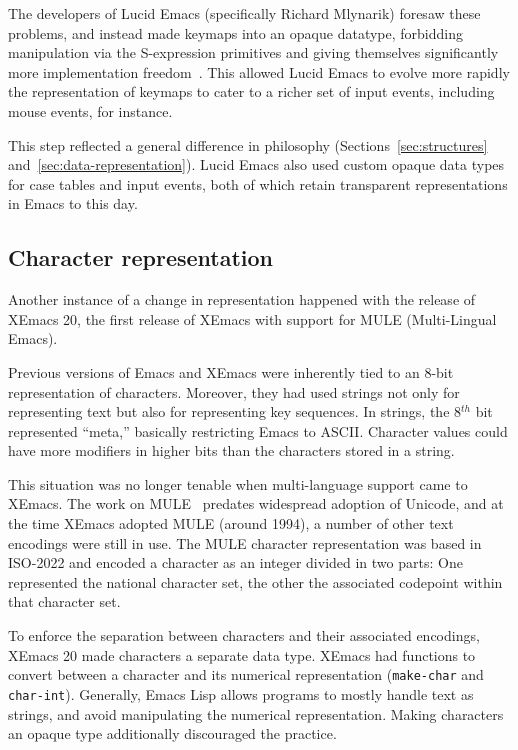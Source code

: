 \documentclass[format=acmsmall, review]{acmart}
\newcommand \Elisp {Emacs Lisp}
\begin{document}
The developers of Lucid Emacs (specifically Richard Mlynarik) foresaw these problems, and
instead made keymaps into an opaque datatype, forbidding manipulation via the
S-expression primitives and giving themselves significantly more implementation
freedom~\cite{Mlynarik-personal}.  This allowed Lucid Emacs to evolve more rapidly the
representation of keymaps to cater to a richer set of input events,
including mouse events, for instance.

This step reflected a general difference in philosophy
(Sections~\ref{sec:structures} and~\ref{sec:data-representation}).
Lucid Emacs also used custom opaque data types
for case tables and input events, both of which retain transparent
representations in Emacs to this day.

\subsection{Character representation}
\label{sec:character-representation}

Another instance of a change in representation happened with the
release of XEmacs 20, the first release of XEmacs with support for
MULE (Multi-Lingual Emacs).

Previous versions of Emacs and XEmacs were inherently tied to an 8-bit
representation of characters.  Moreover, they had used strings not
only for representing text but also for representing key sequences.
In strings, the 8$^{th}$ bit represented ``meta,'' basically restricting
Emacs to ASCII.  Character values could have more
modifiers in higher bits than the characters stored in a string.

This situation was no longer tenable when multi-language support came
to XEmacs.  The work on MULE~\cite{Ohmaki2002} predates widespread
adoption of Unicode, and at the time XEmacs adopted MULE (around
1994), a number of other text encodings were still in use.  The MULE
character representation was based in ISO-2022 and encoded a character as an
integer divided in two parts: One represented the national character set,
the other the associated codepoint within that character set.

To enforce the separation between characters and their associated
encodings, XEmacs 20 made characters a separate data type.  XEmacs had
functions to convert between a character and its numerical
representation (\texttt{make-char} and \texttt{char-int}).  Generally,
\Elisp{} allows programs to mostly handle text as strings,
and avoid manipulating the numerical representation.  Making
characters an opaque type additionally discouraged the practice.
\end{document}
